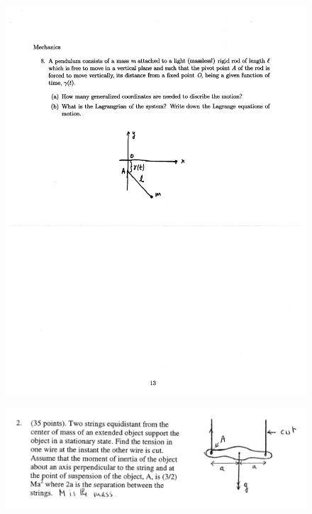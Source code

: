 \documentclass[10pt,a4paper]{article}
\begin{document}
\begin{figure}[H]
 \centering
 \includegraphics[width=16cm]{pdf/1-1T29.png}
\end{figure}
 \newpage
\begin{figure}[H]
 \centering
 \includegraphics[width=16cm]{pdf/1-1T2.png}
\end{figure}
 \newpage
\end{document}
